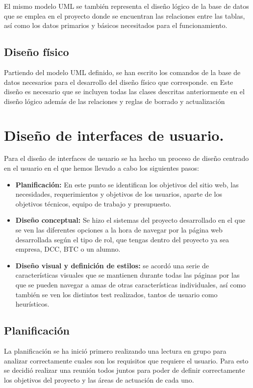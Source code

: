\documentclass[pdftex,11pt,a4paper]{book}
\begin{document}
El mismo modelo UML se también representa el diseño lógico de la base de datos que se emplea en el proyecto donde se encuentran las relaciones entre las tablas, así como los datos primarios y básicos necesitados para el funcionamiento.

\section{Diseño físico}

Partiendo del modelo UML definido, se han escrito los comandos de la base de datos necesarios para el desarrollo del diseño físico que corresponde. en Este diseño es necesario que se incluyen todas las clases descritas anteriormente en el diseño lógico además de las relaciones y reglas de borrado y actualización



\chapter{Diseño de interfaces de usuario.}

Para el diseño de interfaces de usuario se ha hecho un proceso de diseño centrado en el usuario en el que hemos llevado a cabo los siguientes pasos:
\begin{itemize}
\item \textbf{Planificación:} En este punto se identifican los objetivos del sitio web, las necesidades, requerimientos y objetivos de los usuarios, aparte de los objetivos técnicos, equipo de trabajo y presupuesto.

\item \textbf{Diseño conceptual:} Se hizo el sistemas del proyecto desarrollado en el que se ven las diferentes opciones a la hora de navegar por la página web desarrollada según el tipo de rol, que tengas dentro del proyecto ya sea empresa, DCC, BTC o un alumno.

\item \textbf{Diseño visual y definición de estilos:} se acordó una serie de características visuales que se mantienen durante todas las páginas por las que se pueden navegar a amas de otras características individuales, así como también se ven los distintos test realizados, tantos de usuario como heurísticos.

\end{itemize}

\section{Planificación}
La planificación se ha inició primero realizando una lectura en grupo para analizar correctamente cuales son los requisitos que requiere el usuario. Para esto se decidió realizar una reunión todos juntos para poder de definir correctamente los objetivos del proyecto y las áreas de actuación de cada uno.
\end{document}
